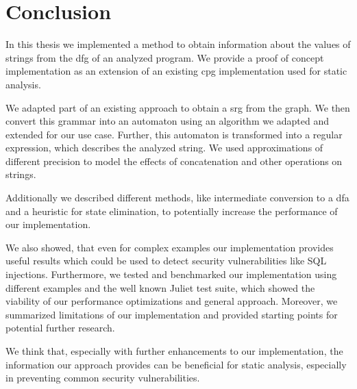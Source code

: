 \chapter{Conclusion}\label{chapter:Conclusion}

In this thesis we implemented a method to obtain information about the values of strings from the \acl{dfg} of an analyzed program. We provide a proof of concept implementation as an extension of an existing \acl{cpg} implementation used for static analysis.

We adapted part of an existing approach to obtain a \acl{srg} from the graph. We then convert this grammar into an automaton using an algorithm we adapted and extended for our use case.
Further, this automaton is transformed into a regular expression, which describes the analyzed string. We used approximations of different precision to model the effects of concatenation and other operations on strings.

Additionally we described different methods, like intermediate conversion to a \ac{dfa} and a heuristic for state elimination, to potentially increase the performance of our implementation.

We also showed, that even for complex examples our implementation provides useful results which could be used to detect security vulnerabilities like SQL injections.
Furthermore, we tested and benchmarked our implementation using different examples and the well known Juliet test suite, which showed the viability of our performance optimizations and general approach.
Moreover, we summarized limitations of our implementation and provided starting points for potential further research.

We think that, especially with further enhancements to our implementation, the information our approach provides can be beneficial for static analysis, especially in preventing common security vulnerabilities.

\begin{comment}	
Summarize your main contributions and observations. Further research directions?

$\leq 1$ page
content...
\end{comment}